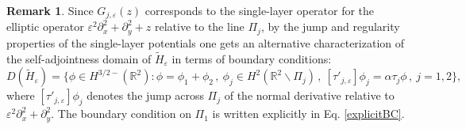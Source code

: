 \documentclass[a4paper,11pt,reqno]{amsart}
\theoremstyle{definition}
\newtheorem{remark}[theorem]{Remark}
\numberwithin{equation}{section}
\newcommand{\RE}{\mathbb R}
\newcommand{\ve}{\varepsilon}
\newcommand{\alve}{\ve}
\begin{document}
\begin{remark}\label{r:bc} Since $G_{j,\ve}(z)$ corresponds to the single-layer operator for the elliptic operator $\ve^2 \partial^2_{x}+\partial^2_{y}+z$ relative to the line $\Pi_{j}$, by the jump and regularity properties of the single-layer potentials one gets
an alternative characterization of the self-adjointness domain of $\widetilde H_{\alve}$ in terms of boundary conditions: 
\[
D(\widetilde H_{\alve}) = 
\big\{\phi\in H^{3/2-}(\RE^2) :  \phi=\phi_{1}+\phi_{2}\,,\ \phi_{j}\in H^{2}(\RE^{2}\backslash\Pi_{j})\,,\  [\tau'_{j,\ve}]\phi_{j}=\alpha\tau_{j}\phi\,,\ j=1,2\big\}, 
\]
where $[\tau'_{j,\ve}]\phi_{j}$
denotes the jump across $\Pi_{j}$ of the normal derivative relative to $ \ve^2 \partial^2_{x}+\partial^2_{y}$. The  boundary condition on $\Pi_1$ is written  explicitly in Eq. \eqref{explicitBC}.
\end{remark}
\end{document}
